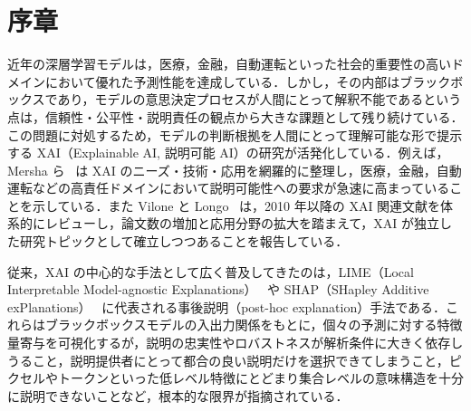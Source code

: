 \chapter{序章}


近年の深層学習モデルは，医療，金融，自動運転といった社会的重要性の高いドメインにおいて優れた予測性能を達成している．しかし，その内部はブラックボックスであり，モデルの意思決定プロセスが人間にとって解釈不能であるという点は，信頼性・公平性・説明責任の観点から大きな課題として残り続けている．この問題に対処するため，モデルの判断根拠を人間にとって理解可能な形で提示する XAI（Explainable AI, 説明可能 AI）の研究が活発化している．例えば，Mersha ら~\cite{mersha2024survey} は XAI のニーズ・技術・応用を網羅的に整理し，医療，金融，自動運転などの高責任ドメインにおいて説明可能性への要求が急速に高まっていることを示している．また Vilone と Longo~\cite{vilone2020systematic} は，2010 年以降の XAI 関連文献を体系的にレビューし，論文数の増加と応用分野の拡大を踏まえて，XAI が独立した研究トピックとして確立しつつあることを報告している．

従来，XAI の中心的な手法として広く普及してきたのは，LIME（Local Interpretable Model-agnostic Explanations）~\cite{ribeiro2016should} や SHAP（SHapley Additive exPlanations）~\cite{lundberg2017unified} に代表される事後説明（post-hoc explanation）手法である．これらはブラックボックスモデルの入出力関係をもとに，個々の予測に対する特徴量寄与を可視化するが，説明の忠実性やロバストネスが解析条件に大きく依存しうること，説明提供者にとって都合の良い説明だけを選択できてしまうこと，ピクセルやトークンといった低レベル特徴にとどまり集合レベルの意味構造を十分に説明できないことなど，根本的な限界が指摘されている．

